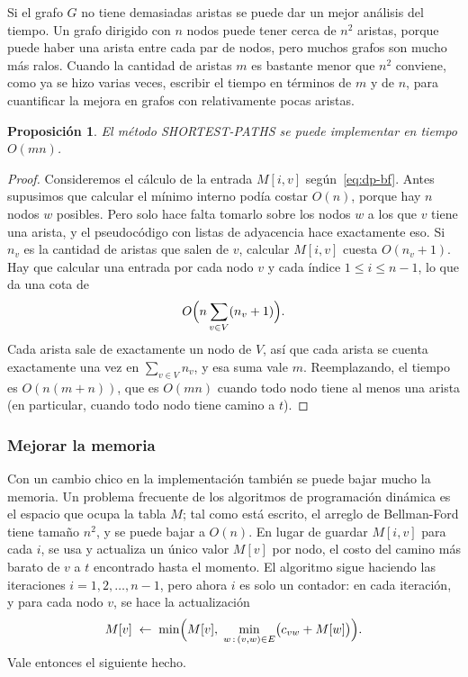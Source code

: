 \documentclass[12pt, spanish, oneside, openany]{book}
\newcommand{\alg}[1]{#1}
\theoremstyle{uprightplain}
\newtheorem{proposicion}[teorema]{Proposición}
\theoremstyle{definition}
\theoremstyle{remark}
\theoremstyle{definition}
\begin{document}
Si el grafo $G$ no tiene demasiadas aristas se puede dar un mejor análisis del tiempo. Un grafo dirigido con $n$ nodos puede tener cerca de $n^2$ aristas, porque puede haber una arista entre cada par de nodos, pero muchos grafos son mucho más ralos. Cuando la cantidad de aristas $m$ es bastante menor que $n^2$ conviene, como ya se hizo varias veces, escribir el tiempo en términos de $m$ y de $n$, para cuantificar la mejora en grafos con relativamente pocas aristas.

\begin{proposicion}
\label{prop:dp-bf-mn}
El método \alg{SHORTEST-PATHS} se puede implementar en tiempo $O(mn)$.
\end{proposicion}
\begin{proof}
Consideremos el cálculo de la entrada $M[i,v]$ según~\eqref{eq:dp-bf}. Antes supusimos que calcular el mínimo interno podía costar $O(n)$, porque hay $n$ nodos $w$ posibles. Pero solo hace falta tomarlo sobre los nodos $w$ a los que $v$ tiene una arista, y el pseudocódigo con listas de adyacencia hace exactamente eso. Si $n_v$ es la cantidad de aristas que salen de $v$, calcular $M[i,v]$ cuesta $O(n_v+1)$. Hay que calcular una entrada por cada nodo $v$ y cada índice $1\le i\le n-1$, lo que da una cota de
\[
O\Bigl(n\sum_{v\in V}(n_v+1)\Bigr).
\]
Cada arista sale de exactamente un nodo de $V$, así que cada arista se cuenta exactamente una vez en $\sum_{v\in V}n_v$, y esa suma vale $m$. Reemplazando, el tiempo es $O(n(m+n))$, que es $O(mn)$ cuando todo nodo tiene al menos una arista (en particular, cuando todo nodo tiene camino a $t$).
\end{proof}

\subsubsection{Mejorar la memoria}

Con un cambio chico en la implementación también se puede bajar mucho la memoria. Un problema frecuente de los algoritmos de programación dinámica es el espacio que ocupa la tabla $M$; tal como está escrito, el arreglo de Bellman-Ford tiene tamaño $n^2$, y se puede bajar a $O(n)$. En lugar de guardar $M[i,v]$ para cada $i$, se usa y actualiza un único valor $M[v]$ por nodo, el costo del camino más barato de $v$ a $t$ encontrado hasta el momento. El algoritmo sigue haciendo las iteraciones $i=1,2,\dots,n-1$, pero ahora $i$ es solo un contador: en cada iteración, y para cada nodo $v$, se hace la actualización
\[
M[v] \;\leftarrow\; \min\Bigl(M[v],\;\min_{w\,:\,(v,w)\in E}\bigl(c_{vw}+M[w]\bigr)\Bigr).
\]
Vale entonces el siguiente hecho.
\end{document}
